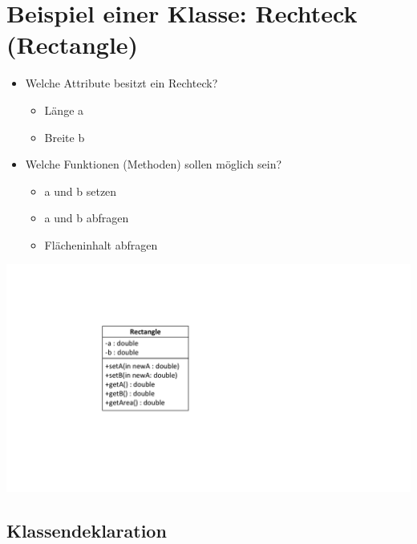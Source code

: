 \section{Beispiel einer Klasse: Rechteck (Rectangle)}
\begin{multicols}{2}
\begin{itemize}
	\item Welche Attribute besitzt ein Rechteck?
	\begin{itemize}
		\item Länge a
		\item Breite b
	\end{itemize}
	\item Welche Funktionen (Methoden) sollen möglich sein?
	\begin{itemize}
		\item a und b setzen
		\item a und b abfragen
		\item Flächeninhalt abfragen
	\end{itemize}
\end{itemize}
\columnbreak
\includegraphics[width=0.6\linewidth]{images/klasse4.pdf}
\end{multicols}

\subsection{Klassendeklaration}
\vspace{-\baselineskip}
\begin{minipage}{0.4\linewidth}
	
\end{minipage}

